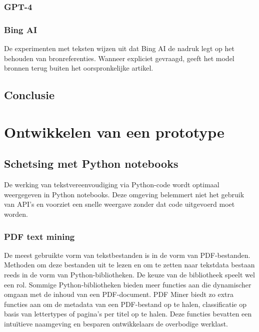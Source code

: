 \subsubsection{GPT-4}


\subsubsection{Bing AI}


De experimenten met teksten wijzen uit dat Bing AI de nadruk legt op het behouden van bronreferenties. Wanneer expliciet gevraagd, geeft het model bronnen terug buiten het oorspronkelijke artikel. 

\subsection{Conclusie}

\section{Ontwikkelen van een prototype}

\subsection{Schetsing met Python notebooks}

De werking van tekstvereenvoudiging via Python-code wordt optimaal weergegeven in Python notebooks. Deze omgeving belemmert niet het gebruik van API's en voorziet een snelle weergave zonder dat code uitgevoerd moet worden.

\subsubsection{PDF text mining}

De meest gebruikte vorm van tekstbestanden is in de vorm van PDF-bestanden. Methoden om deze bestanden uit te lezen en om te zetten naar tekstdata bestaan reeds in de vorm van Python-bibliotheken. De keuze van de bibliotheek speelt wel een rol. Sommige Python-bibliotheken bieden meer functies aan die dynamischer omgaan met de inhoud van een PDF-document. PDF Miner biedt zo extra functies aan om de metadata van een PDF-bestand op te halen, classificatie op basis van lettertypes of pagina's per titel op te halen. Deze functies bevatten een intuïtieve naamgeving en besparen ontwikkelaars de overbodige werklast.

